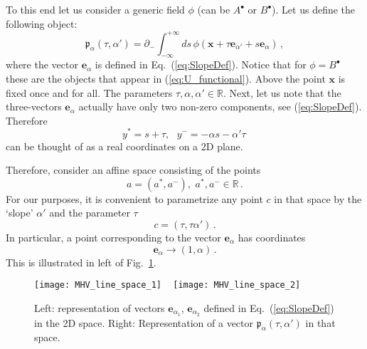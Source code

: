 \documentclass[english,american]{article}
\begin{document}
To this end let us consider a generic field $\phi$ (can be $A^{\bullet}$
or $B^{\bullet}$). Let us define the following object:
\begin{equation}
\mathfrak{p}_{\alpha}\left(\tau,\alpha'\right)=\partial_{-}\int_{-\infty}^{+\infty}ds\,\phi\left(\mathbf{x}+\tau\mathbf{e}_{\alpha'}+s\mathbf{e}_{\alpha}\right)\,,\label{eq:l_def_1}
\end{equation}
where the vector $\mathbf{e}_{\alpha}$ is defined in Eq.~(\ref{eq:SlopeDef}).
Notice that for $\phi=B^{\bullet}$ these are the objects that appear
in (\ref{eq:U_functional}). Above the point $\mathbf{x}$ is fixed
once and for all. The parameters $\tau,\alpha,\alpha'\in\mathbb{R}$.
Next, let us note that the three-vectors $\mathbf{e}_{\alpha}$ actually
have only two non-zero components, see (\ref{eq:SlopeDef}). Therefore
\begin{equation}
y^{*}=s+\tau,\,\,\,\, y^{-}=-\alpha s-\alpha'\tau\,
\end{equation}
can be thought of as a real coordinates on a 2D plane.

Therefore, consider an affine space consisting of the points 
\begin{equation}
a=\left(a^{*},a^{-}\right),\,\, a^{*},a^{-}\in\mathbb{R}\,.
\end{equation}
For our purposes, it is convenient to parametrize any point $c$ in
that space by the `slope' $\alpha'$ and the parameter $\tau$ 
\begin{equation}
c=\left(\tau,\tau\alpha'\right)\,.
\end{equation}
In particular, a point corresponding to the vector $\mathbf{e}_{\alpha}$
has coordinates
\begin{equation}
\mathbf{e}_{\alpha}\rightarrow\left(1,\alpha\right)\,.
\end{equation}
This is illustrated in left of Fig.~\ref{fig:slope_def}.

\begin{figure}
\begin{centering}
\texttt{[image: MHV\_line\_space\_1]}$\,\,\,\,\,\,\,$\texttt{[image: MHV\_line\_space\_2]}
\par\end{centering}

\caption{Left: representation of vectors $\mathbf{e}_{\alpha_{1}}$, $\mathbf{e}_{\alpha_{2}}$
defined in Eq.~(\ref{eq:SlopeDef}) in the 2D space. Right: Representation
of a vector \foreignlanguage{english}{$\mathfrak{p}_{\alpha}\left(\tau,\alpha'\right)$}
in that space.\label{fig:slope_def}}
\end{figure}
\end{document}
